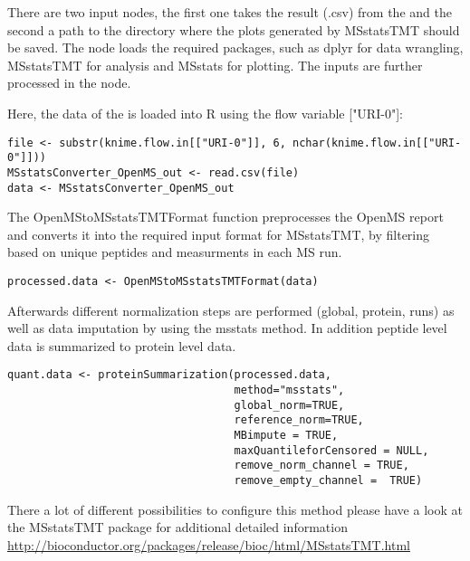 \noindent There are two input nodes, the first one takes the result (.csv) from the  and the second a path to the directory where the plots generated by MSstatsTMT should be saved. The  node loads the required packages, such as dplyr for data wrangling, MSstatsTMT for analysis and MSstats for plotting. The inputs are further processed in the  node.  

\noindent Here, the data of the  is loaded into R using the flow variable ["URI-0"]:
\begin{listing}
\begin{verbatim}
file <- substr(knime.flow.in[["URI-0"]], 6, nchar(knime.flow.in[["URI-0"]]))
MSstatsConverter_OpenMS_out <- read.csv(file)
data <- MSstatsConverter_OpenMS_out
\end{verbatim}
\end{listing}

\noindent The OpenMStoMSstatsTMTFormat function preprocesses the OpenMS report and converts it into the required input format for MSstatsTMT, by filtering based on unique peptides and measurments in each MS run.

\begin{listing}
\begin{verbatim}
processed.data <- OpenMStoMSstatsTMTFormat(data)
\end{verbatim}
\end{listing}

\noindent Afterwards different normalization steps are performed (global, protein, runs) as well as data imputation by using the msstats method. In addition peptide level data is summarized to protein level data. 

\begin{listing}
\begin{verbatim}
quant.data <- proteinSummarization(processed.data,
                                   method="msstats",
                                   global_norm=TRUE,
                                   reference_norm=TRUE,
                                   MBimpute = TRUE,
                                   maxQuantileforCensored = NULL,
                                   remove_norm_channel = TRUE,
                                   remove_empty_channel =  TRUE)
\end{verbatim}
\end{listing}
        
\noindent There a lot of different possibilities to configure this method please have a look at the MSstatsTMT package for additional detailed information \url{http://bioconductor.org/packages/release/bioc/html/MSstatsTMT.html}                       

